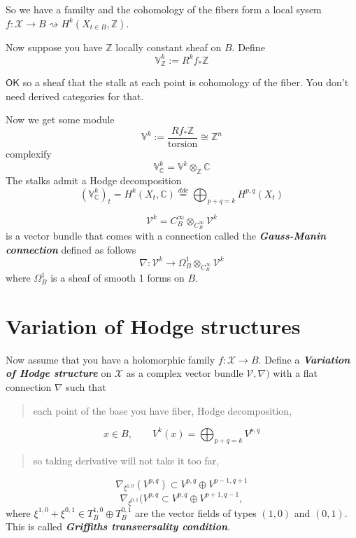 So we have a familty and the cohomology of the fibers form a local sysem $f:\mathcal{X}\to  B\rightsquigarrow H^{k}(X_{t\in B},\mathbb{Z})$.

Now suppose you have $\mathbb{Z}$ locally constant sheaf on $B$. Define \[\mathbb{V}^k_\mathbb{Z}:=R^kf_*\mathbb{Z}\]

{\color{5}$\mathsf{OK}$ so a sheaf that the stalk at each point is cohomology of the fiber. You don't need derived categories for that.} 

Now we get some module
\[\mathbb{V}^k:=\dfrac{Rf_* \mathbb{Z}}{\text{torsion} }\cong \mathbb{Z}^n\]
complexify
\[\mathbb{V}^k_{\mathbb{C}}=\mathbb{V}^k\otimes_{\mathbb{Z}}\mathbb{C}\]
The stalks admit a Hodge decomposition
\[(\mathbb{V}^k_{\mathbb{C}})_t=H^{k}(X_t,\mathbb{C})\overset{ddc}{=}\bigoplus_{p+q=k} H^{p,q}(X_t) \]

\begin{defn}\leavevmode
	\[\mathcal{V}^k=C_B^\infty\otimes_{C^\infty_B}\mathcal{V}^k\]
	is a vector bundle that comes with a connection called the \textit{\textbf{Gauss-Manin connection}} defined as follows
	\[\nabla :\mathcal{V}^k\to \Omega^{1}_B \otimes_{C^\infty_B}\mathcal{V}^k\]
	where $\Omega^1_B$ is a sheaf of smooth 1 forms on $B$.
\end{defn}

\section{Variation of Hodge structures}

Now assume that you have a holomorphic family $f:\mathcal{X}\to B$. Define a  \textit{\textbf{Variation of Hodge structure}} on  $\mathcal{X}$ as a complex vector bundle $\mathcal{V},\nabla )$ with a flat connection $\nabla$ such that

{\color{4}\begin{quotation}
	each point of the base you have fiber, Hodge decomposition,
\end{quotation}}
\[x\in B, \qquad V^k(x)=\bigoplus_{p+q=k}V^{p,q}  \]
{\color{4}\begin{quotation}
	so taking derivative will not take it too far,
\end{quotation}}
\[\nabla_{\xi^{1,0}}(V^{p,q} )\subset V^{p,q} \oplus V^{p-1,q+1}\]
\[\nabla_{\xi^{0,1} }(V^{p,q} \subset V^{p,q}\oplus V^{p+1,q-1},\]
where $\xi^{1,0}+\xi^{0,1} \in T^{1,0}_B\oplus T^{0,1}_B$ are the vector fields of types $(1,0)$ and  $(0,1)$. This is called  \textit{\textbf{Griffiths transversality condition}}.

